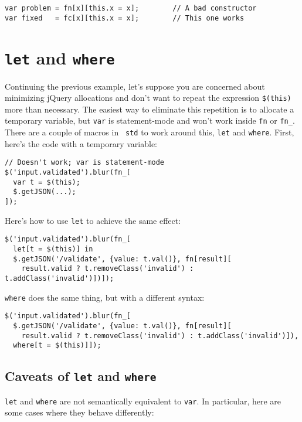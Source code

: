 \documentclass{report}
\begin{document}
\begin{verbatim}
var problem = fn[x][this.x = x];        // A bad constructor
var fixed   = fc[x][this.x = x];        // This one works
\end{verbatim}

\section{{\tt let} and {\tt where}}\label{sec:the-std-library-let-and-where}
    Continuing the previous example, let's suppose you are concerned about minimizing jQuery allocations and don't want to repeat the expression \verb|$(this)| more than necessary. The easiest
    way to eliminate this repetition is to allocate a temporary variable, but {\tt var} is statement-mode and won't work inside {\tt fn} or \verb|fn_|. There are a couple of macros in {\tt
    std} to work around this, {\tt let} and {\tt where}. First, here's the code with a temporary variable:

\begin{verbatim}
// Doesn't work; var is statement-mode
$('input.validated').blur(fn_[
  var t = $(this);
  $.getJSON(...);
]);
\end{verbatim}

    Here's how to use {\tt let} to achieve the same effect:

\begin{verbatim}
$('input.validated').blur(fn_[
  let[t = $(this)] in
  $.getJSON('/validate', {value: t.val()}, fn[result][
    result.valid ? t.removeClass('invalid') : t.addClass('invalid')])]);
\end{verbatim}

    {\tt where} does the same thing, but with a different syntax:

\begin{verbatim}
$('input.validated').blur(fn_[
  $.getJSON('/validate', {value: t.val()}, fn[result][
    result.valid ? t.removeClass('invalid') : t.addClass('invalid')]),
  where[t = $(this)]]);
\end{verbatim}

\subsection{Caveats of {\tt let} and {\tt where}}\label{sec:the-std-library-let-and-where-caveats}
      {\tt let} and {\tt where} are not semantically equivalent to {\tt var}. In particular, here are some cases where they behave differently:
\end{document}
